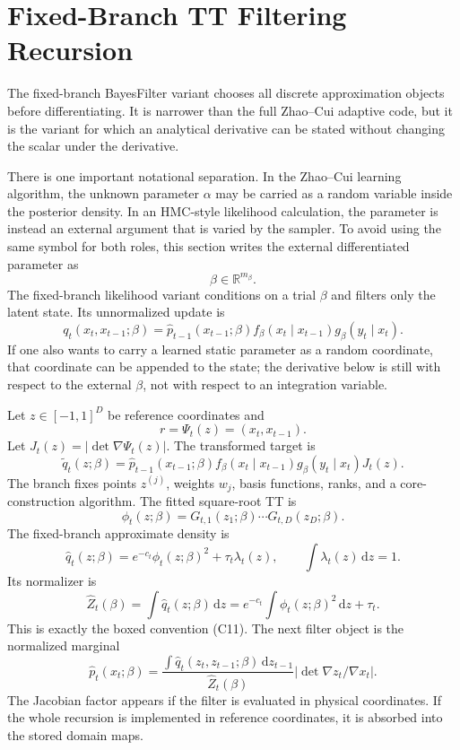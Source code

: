 \documentclass[11pt]{article}
\newcommand{\R}{\mathbb R}
\newcommand{\dd}{\,\mathrm d}
\begin{document}
\section{Fixed-Branch TT Filtering Recursion}

The fixed-branch BayesFilter variant chooses all discrete approximation objects
before differentiating.  It is narrower than the full Zhao--Cui adaptive code,
but it is the variant for which an analytical derivative can be stated without
changing the scalar under the derivative.

There is one important notational separation.  In the Zhao--Cui learning
algorithm, the unknown parameter \(\alpha\) may be carried as a random variable
inside the posterior density.  In an HMC-style likelihood calculation, the
parameter is instead an external argument that is varied by the sampler.  To
avoid using the same symbol for both roles, this section writes the external
differentiated parameter as
\[
    \beta\in\R^{m_\beta}.
\]
The fixed-branch likelihood variant conditions on a trial \(\beta\) and filters
only the latent state.  Its unnormalized update is
\[
    q_t(x_t,x_{t-1};\beta)
    =
    \widehat p_{t-1}(x_{t-1};\beta)
    f_\beta(x_t\mid x_{t-1})
    g_\beta(y_t\mid x_t).
\]
If one also wants to carry a learned static parameter as a random coordinate,
that coordinate can be appended to the state; the derivative below is still
with respect to the external \(\beta\), not with respect to an integration
variable.

Let \(z\in[-1,1]^D\) be reference coordinates and
\[
    r=\Psi_t(z)=(x_t,x_{t-1}).
\]
Let \(J_t(z)=|\det\nabla\Psi_t(z)|\).  The transformed target is
\[
    \widetilde q_t(z;\beta)
    =
    \widehat p_{t-1}(x_{t-1};\beta)
    f_\beta(x_t\mid x_{t-1})
    g_\beta(y_t\mid x_t)
    J_t(z).
    \tag{FB1}
\]
The branch fixes points \(z^{(j)}\), weights \(w_j\), basis functions, ranks,
and a core-construction algorithm.  The fitted square-root TT is
\[
    \phi_t(z;\beta)=G_{t,1}(z_1;\beta)\cdots G_{t,D}(z_D;\beta).
    \tag{FB2}
\]
The fixed-branch approximate density is
\[
    \widehat q_t(z;\beta)
    =
    e^{-c_t}\phi_t(z;\beta)^2+\tau_t\lambda_t(z),
    \qquad
    \int\lambda_t(z)\dd z=1.
    \tag{FB3}
\]
Its normalizer is
\[
    \widehat Z_t(\beta)
    =
    \int\widehat q_t(z;\beta)\dd z
    =
    e^{-c_t}\int\phi_t(z;\beta)^2\dd z+\tau_t.
    \tag{FB4}
\]
This is exactly the boxed convention (C11).
The next filter object is the normalized marginal
\[
    \widehat p_t(x_t;\beta)
    =
    \frac{
    \int \widehat q_t(z_t,z_{t-1};\beta)\dd z_{t-1}}
    {\widehat Z_t(\beta)}
    \left|\det\nabla z_t/\nabla x_t\right|.
    \tag{FB5}
\]
The Jacobian factor appears if the filter is evaluated in physical coordinates.
If the whole recursion is implemented in reference coordinates, it is absorbed
into the stored domain maps.
\end{document}
